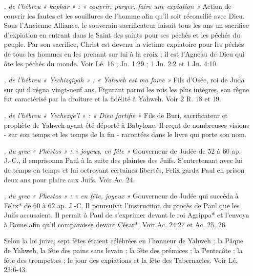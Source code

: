 \begin{multicols}{2}
{\textit{, de l'hébreu « kaphar » : « couvrir, purger, faire une expiation »}\newline
Action de couvrir les fautes et les souillures de l'homme afin qu'il soit réconcilié avec Dieu. Sous l'Ancienne Alliance, le souverain sacrificateur faisait tous les ans un sacrifice d'expiation en entrant dans le Saint des saints pour ses péchés et les péchés du peuple. Par son sacrifice, Christ est devenu la victime expiatoire pour les péchés de tous les hommes en les prenant sur lui à la croix ; il est l'Agneau de Dieu qui ôte les péchés du monde. Voir Lé. 16 ; Jn. 1:29 ; 1 Jn. 2:2 et 1 Jn. 4:10.

\textit{, de l'hébreu « Yechizqiyah » : « Yahweh est ma force »}\newline
Fils d'Osée, roi de Juda sur qui il régna vingt-neuf ans. Figurant parmi les rois les plus intègres, son règne fut caractérisé par la droiture et la fidélité à Yahweh. Voir 2 R. 18 et 19.

\textit{, de l'hébreu « Yechezqe'l » : « Dieu fortifie »}\newline
Fils de Buri, sacrificateur et prophète de Yahweh ayant été déporté à Babylone. Il reçut de nombreuses visions - sur son temps et les temps de la fin - racontées dans le livre qui porte son nom.

\textit{, du grec « Phestos » : « joyeux, en fête »}\newline
Gouverneur de Judée de 52 à 60 ap. J.-C., il emprisonna Paul à la suite des plaintes des Juifs. S'entretenant avec lui de temps en temps et lui octroyant certaines libertés, Felix garda Paul en prison deux ans pour plaire aux Juifs. Voir Ac. 24.

\textit{, du grec « Phestos » : « en fête, joyeux »}\newline
Gouverneur de Judée qui succéda à Félix* de 60 à 62 ap. J.-C. Il poursuivit l'instruction du procès de Paul que les Juifs accusaient. Il permit à Paul de s'exprimer devant le roi Agrippa* et l'envoya à Rome afin qu'il comparaisse devant César*. Voir Ac. 24:27 et Ac. 25, 26.

\textit{}\newline
Selon la loi juive, sept fêtes étaient célébrées en l'honneur de Yahweh : la Pâque de Yahweh, la fête des pains sans levain ; la fête des prémices ; la Pentecôte ; la fête des trompettes ; le jour des expiations et la fête des Tabernacles. Voir Lé. 23:6-43.

}
\end{multicols}
